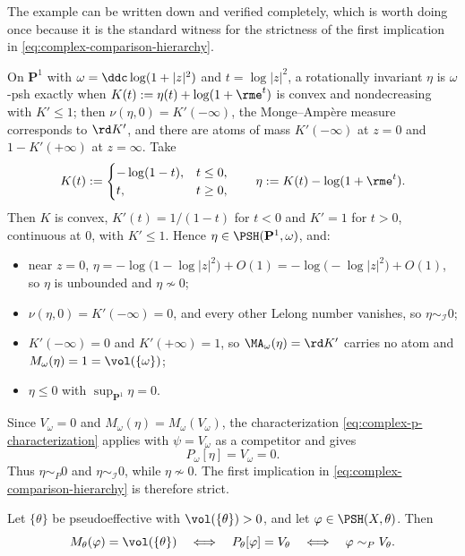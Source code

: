 The example can be written down and verified completely, which is worth
doing once because it is the standard witness for the strictness of the
first implication in \eqref{eq:complex-comparison-hierarchy}.

\begin{remark}
\label{rem:ch51-loglog-explicit}
On \(\mathbf P^1\) with \(\omega=\ddc\log(1+|z|^2)\) and
\(t=\log|z|^2\), a rotationally invariant \(\eta\) is \(\omega\)-psh
exactly when \(K(t):=\eta(t)+\log(1+\rme^t)\) is convex and
nondecreasing with \(K'\leq1\); then \(\nu(\eta,0)=K'(-\infty)\), the
Monge--Amp\`ere measure corresponds to \(\rd K'\), and there are atoms of
mass \(K'(-\infty)\) at \(z=0\) and \(1-K'(+\infty)\) at \(z=\infty\).
Take
\[
 K(t):=
 \begin{cases}
 -\log(1-t), & t\leq0,\\
 t, & t\geq0 ,
 \end{cases}
 \qquad
 \eta:=K(t)-\log(1+\rme^t).
\]
Then \(K\) is convex, \(K'(t)=1/(1-t)\) for \(t<0\) and \(K'=1\) for
\(t>0\), continuous at \(0\), with \(K'\leq1\).  Hence
\(\eta\in\PSH(\mathbf P^1,\omega)\), and:
\begin{itemize}
\item near \(z=0\), \(\eta=-\log\bigl(1-\log|z|^2\bigr)+O(1)
      =-\log\bigl(-\log|z|^2\bigr)+O(1)\), so \(\eta\) is unbounded and
      \(\eta\not\sim0\);
\item \(\nu(\eta,0)=K'(-\infty)=0\), and every other Lelong number
      vanishes, so \(\eta\sim_{\mathcal I}0\);
\item \(K'(-\infty)=0\) and \(K'(+\infty)=1\), so
      \(\MA_\omega(\eta)=\rd K'\) carries no atom and
      \(M_\omega(\eta)=1=\vol(\{\omega\})\);
\item \(\eta\leq0\) with \(\sup_{\mathbf P^1}\eta=0\).
\end{itemize}
Since \(V_\omega=0\) and \(M_\omega(\eta)=M_\omega(V_\omega)\), the
characterization \eqref{eq:complex-p-characterization} applies with
\(\psi=V_\omega\) as a competitor and gives
\[
 P_\omega[\eta]=V_\omega=0 .
\]
Thus \(\eta\sim_P0\) and \(\eta\sim_{\mathcal I}0\), while
\(\eta\not\sim0\).  The first implication in
\eqref{eq:complex-comparison-hierarchy} is therefore strict.
\end{remark}

\begin{corollary}
\label{cor:ch51-full-mass-envelope}
Let \(\{\theta\}\) be pseudoeffective with \(\vol(\{\theta\})>0\), and let
\(\varphi\in\PSH(X,\theta)\).  Then
\[
 M_\theta(\varphi)=\vol(\{\theta\})
 \quad\Longleftrightarrow\quad
 P_\theta[\varphi]=V_\theta
 \quad\Longleftrightarrow\quad
 \varphi\sim_PV_\theta .
\]
\end{corollary}

